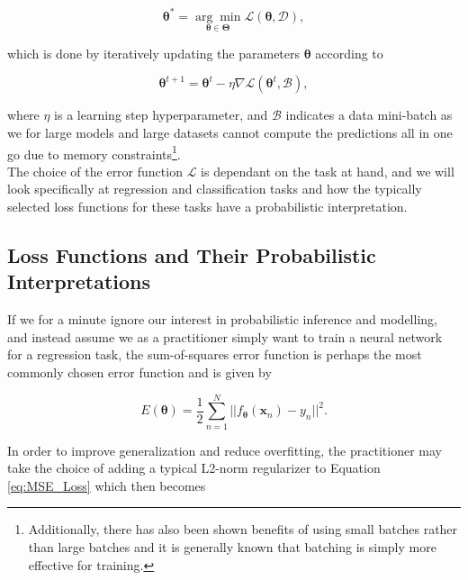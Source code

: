 \begin{equation}
    \bm{\theta}^* = \underset{\bm{\theta} \in \bm{\Theta}}{\arg \min} \mathcal{L}(\bm{\theta}, \mathcal{D}),
\end{equation}

\noindent which is done by iteratively updating the parameters $\bm{\theta}$ according to

\begin{equation}
    \bm{\theta}^{t+1} = \bm{\theta}^t - \eta\nabla\mathcal{L}(\bm{\theta}^t, \mathcal{B}),
\end{equation}

\noindent where $\eta$ is a learning step hyperparameter, and $\mathcal{B}$ indicates a data mini-batch as we for large models and large datasets cannot compute the predictions all in one go due to memory constraints\footnote{Additionally, there has also been shown benefits of using small batches rather than large batches \citep{Masters2018RevisitingSB} and it is generally known that batching is simply more effective for training.}. \\

\noindent The choice of the error function $\mathcal{L}$ is dependant on the task at hand, and we will look specifically at regression and classification tasks and how the typically selected loss functions for these tasks have a probabilistic interpretation. \\

\subsection{Loss Functions and Their Probabilistic Interpretations}
\label{sec:losses_and_prob}


 If we for a minute ignore our interest in probabilistic inference and modelling, and instead assume we as a practitioner simply want to train a neural network for a regression task, the sum-of-squares error function is perhaps the most commonly chosen error function and is given by

\begin{equation}
    E(\mathbf{\bm{\theta}}) = \frac{1}{2}\sum^N_{n=1}||f_{\bm{\theta}}(\mathbf{x}_n)-y_n||^2.
    \label{eq:MSE_Loss}
\end{equation}

\noindent In order to improve generalization and reduce overfitting, the practitioner may take the choice of adding a typical L2-norm regularizer to Equation \ref{eq:MSE_Loss} which then becomes

